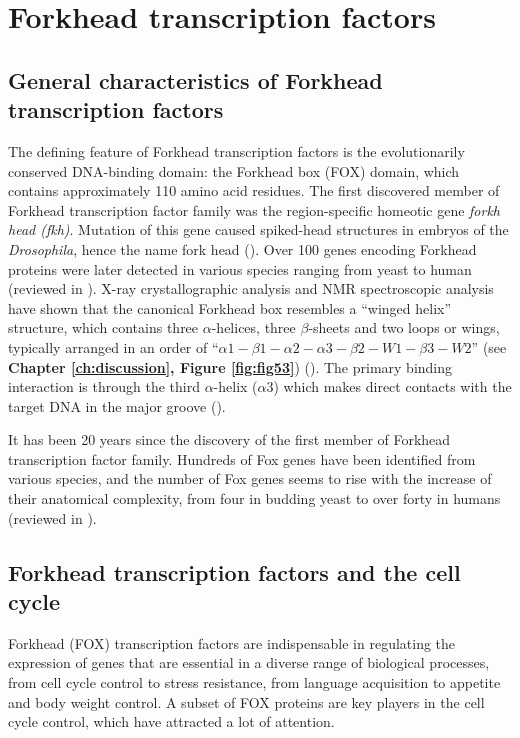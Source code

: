 \section{Forkhead transcription factors}

\subsection{General characteristics of Forkhead transcription factors}

The defining feature of Forkhead transcription factors is the evolutionarily conserved DNA-binding domain: the Forkhead box (FOX) domain, which contains approximately 110 amino acid residues. The first discovered member of Forkhead transcription factor family was the region-specific homeotic gene \textit{forkh head (fkh)}. Mutation of this gene caused spiked-head structures in embryos of the \textit{Drosophila}, hence the name fork head (\cite{weigel1989the}). Over 100 genes encoding Forkhead proteins were later detected in various species ranging from yeast to human (reviewed in \cite{lai1993hepatocyte,kaufmann1996five}). X-ray crystallographic analysis and NMR spectroscopic analysis have shown that the canonical Forkhead box resembles a \enquote{winged helix} structure, which contains three $\alpha$-helices, three $\beta$-sheets and two loops or wings, typically arranged in an order of \enquote{$\alpha 1 - \beta 1 - \alpha 2 - \alpha 3 - \beta 2 - W1 - \beta 3 - W2 $} (see \textbf{Chapter \ref{ch:discussion}, Figure \ref{fig:fig53}}) (\cite{clark1993co-crystal,jin1999dynamic,van-dongen2000solution}). The primary binding interaction is through the third $\alpha$-helix ($\alpha 3$) which makes direct contacts with the target DNA in the major groove (\cite{clark1993co-crystal,marsden1998structural}).

It has been 20 years since the discovery of the first member of Forkhead transcription factor family. Hundreds of Fox genes have been identified from various species, and the number of Fox genes seems to rise with the increase of their anatomical complexity, from four in budding yeast to over forty in humans (reviewed in \cite{wijchers2006in,hannenhalli2009the}).

\subsection{Forkhead transcription factors and the cell cycle}

Forkhead (FOX) transcription factors are indispensable in regulating the expression of genes that are essential in a diverse range of biological processes, from cell cycle control to stress resistance, from language acquisition to appetite and body weight control. A subset of FOX proteins are key players in the cell cycle control, which have attracted a lot of attention.

